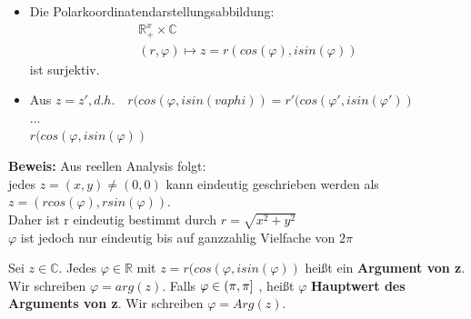 \begin{itemize}
	\item
	Die Polarkoordinatendarstellungsabbildung:
	\begin{eqnarray*}
	\mathds{R}^x_+ \times \mathds{C} \\
	(r,\varphi) \mapsto z = r(cos(\varphi),i sin(\varphi))
	\end{eqnarray*}
	ist surjektiv.
	\item
	Aus $z = z', d.h.\quad r(cos(\varphi, i sin(vaphi)) = r'(cos(\varphi', i sin(\varphi'))$\\
	...\\$r(cos(\varphi, i sin(\varphi))$
\end{itemize}
\textbf{Beweis:}
Aus reellen Analysis folgt: \\
jedes $z = (x,y) \neq (0,0)$ kann eindeutig geschrieben werden als $z = (r cos(\varphi), rsin(\varphi))$. \\
Daher ist r eindeutig bestimmt durch $r = \sqrt{x^2 + y^2}$ \\
$\varphi$ ist jedoch nur eindeutig bis auf ganzzahlig Vielfache von $2\pi$

\begin{defi}
	Sei $z \in \mathds{C}$. Jedes $\varphi \in  \mathds{R}$ mit $z =r(cos(\varphi, i sin(\varphi))  $ heißt ein \textbf{Argument von z}. Wir schreiben $\varphi = arg(z)$.
	Falls $\varphi \in (\-\pi,\pi]$ , heißt $\varphi$ \textbf{Hauptwert des Arguments von z}. Wir schreiben $\varphi = Arg(z)$.
\end{defi}
